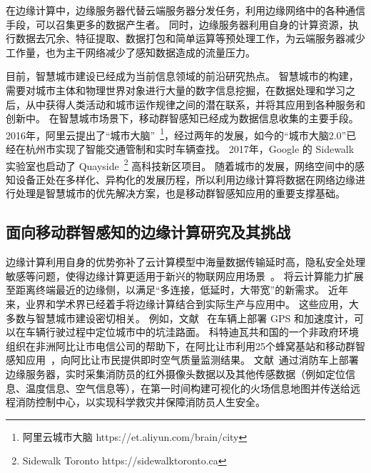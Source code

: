 在边缘计算中，边缘服务器代替云端服务器分发任务，利用边缘网络中的各种通信手段，可以召集更多的数据产生者。
同时，边缘服务器利用自身的计算资源，执行数据去冗余、特征提取、数据打包和简单运算等预处理工作，为云端服务器减少工作量，也为主干网络减少了感知数据造成的流量压力。


目前，智慧城市建设已经成为当前信息领域的前沿研究热点。
智慧城市的构建，需要对城市主体和物理世界对象进行大量的数字信息挖掘，在数据处理和学习之后，从中获得人类活动和城市运作规律之间的潜在联系，并将其应用到各种服务和创新中。
在智慧城市场景下，移动群智感知已经成为数据信息收集的主要手段。
2016年，阿里云提出了“城市大脑”~\footnote{阿里云城市大脑 https://et.aliyun.com/brain/city}，经过两年的发展，如今的“城市大脑2.0”已经在杭州市实现了智能交通管制和实时车辆查找。
2017年，Google 的 Sidewalk 实验室也启动了 Quayside~\footnote{Sidewalk Toronto https://sidewalktoronto.ca} 高科技新区项目。
随着城市的发展，网络空间中的感知设备正处在多样化、异构化的发展历程，所以利用边缘计算将数据在网络边缘进行处理是智慧城市的优先解决方案，也是移动群智感知应用的重要支撑基础。

\subsection{面向移动群智感知的边缘计算研究及其挑战}


边缘计算利用自身的优势弥补了云计算模型中海量数据传输延时高，隐私安全处理敏感等问题，使得边缘计算更适用于新兴的物联网应用场景~\cite{DBLP:journals/cm/SunA16}。
将云计算能力扩展至距离终端最近的边缘侧，以满足“多连接，低延时，大带宽”的新需求。
近年来，业界和学术界已经着手将边缘计算结合到实际生产与应用中。
这些应用，大多数与智慧城市建设密切相关。
例如，文献~ 在车辆上部署 GPS 和加速度计，可以在车辆行驶过程中定位城市中的坑洼路面。
科特迪瓦共和国的一个非政府环境组织在非洲阿比让市电信公司的帮助下，在阿比让市利用25个蜂窝基站和移动群智感知应用~\cite{DBLP:conf/huc/ZhangXWC14}，向阿比让市民提供即时空气质量监测结果。
文献~通过消防车上部署边缘服务器，实时采集消防员的红外摄像头数据以及其他传感数据（例如定位信息、温度信息、空气信息等），在第一时间构建可视化的火场信息地图并传送给远程消防控制中心，以实现科学救灾并保障消防员人生安全。

